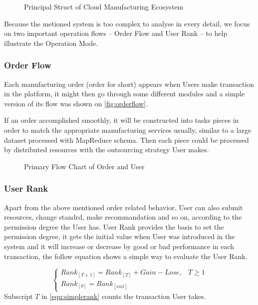 \begin{figure}[!h]
\centering
\caption{Principal Struct of Cloud Manufacturing Ecosystem}
\label{fig:platformstruct}
\end{figure}

Because the metioned system is too complex to analyse in every detail, we focus on two important operation flows -- Order Flow and User Rank -- to help illustrate the Operation Mode. 

\subsubsection{Order Flow}
Each manufacturing order (order for short) appears when Users make transaction in the platform, it might then go through some different modules and a simple version of its flow was shown on \autoref{fig:orderflow}.

If an order accomplished smoothly, it will be constructed into tasks pieces in order to match the appropriate manufacturing services usually, similar to a large dataset processed with MapReduce\cite{Dean2008} schema. Then each piece could be processed by distributed resources with the outsourcing strategy User makes.

\begin{figure}[!h]
\centering\small
\caption{ Primary Flow Chart of Order and User}
\end{figure}
\subsubsection{User Rank}
Apart from the above mentioned order related behavior, User can also submit resources, change standrd, make recommandation and so on, according to the permission degree the User has. User Rank provides the basis to set the permission degree, it gets the initial value when User was introduced in the system and it will increase or decrease by good or bad performance in each transaction, the follow equation shows a simple way to evaluate the User Rank. 

\begin{equation}
  \begin{cases}
      Rank_{[T+1]} = Rank_{[T]} + Gain - Lose, & T \geqslant 1\\
      Rank_{[0]} = Rank_{[init]}
  \end{cases}
\label{equ:simplerank}
\end{equation}
Subscript $T$ in \eqref{equ:simplerank} counts the transaction User takes. 

